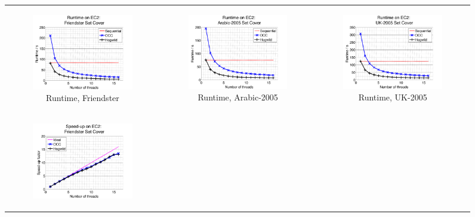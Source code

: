 \begin{figure}[ht]
  \centering
  \begin{tabular}{ccc}
	  \begin{subfigure}[b]{0.31\textwidth}
	  	\includegraphics[width=150pt]{images/runtime_friendster10M_setcover.png}
			\caption{Runtime, Friendster}
			\label{appfig:runtime_friendster10M_setcover}
	  \end{subfigure} &
	  \begin{subfigure}[b]{0.31\textwidth}
	  	\includegraphics[width=150pt]{images/runtime_arabic2005_setcover.png}
			\caption{Runtime, Arabic-2005}
			\label{appfig:runtime_arabic2005_setcover}
	  \end{subfigure} &
	  \begin{subfigure}[b]{0.31\textwidth}
	  	\includegraphics[width=150pt]{images/runtime_uk2005_setcover.png}
			\caption{Runtime, UK-2005}
			\label{appfig:runtime_uk2005_setcover}
	  \end{subfigure} \\
	  \begin{subfigure}[b]{0.31\textwidth}
	  	\includegraphics[width=150pt]{images/speedup_friendster10M_setcover.png}

\end{subfigure}
\end{tabular}
\end{figure}
